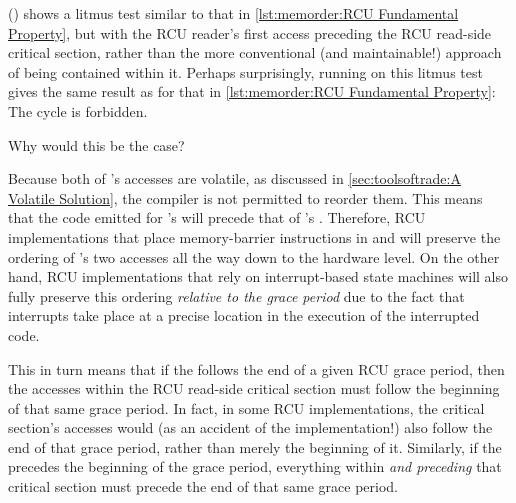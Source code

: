 \begin{listing}[tb]

\caption{What Happens Before RCU Readers?}
\label{lst:memorder:What Happens Before RCU Readers?}
\end{listing}

()
shows a litmus test similar to that in
\cref{lst:memorder:RCU Fundamental Property},
but with the RCU reader's first access preceding the RCU read-side critical
section, rather than the more conventional (and maintainable!) approach of
being contained within it.
Perhaps surprisingly, running  on this litmus test gives the
same result as for that in
\cref{lst:memorder:RCU Fundamental Property}:
The cycle is forbidden.

Why would this be the case?

Because both of 's accesses are volatile,
as discussed in
\cref{sec:toolsoftrade:A Volatile Solution},
the compiler is not permitted to reorder them.
This means that the code emitted for 's  will
precede that of 's .
Therefore, RCU implementations that place memory-barrier instructions in
 and  will preserve the ordering
of 's two accesses all the way down to the hardware level.
On the other hand, RCU implementations that rely on interrupt-based
state machines will also fully preserve this ordering
\emph{relative to the grace period} due to the fact that interrupts take
place at a precise location in the execution of the interrupted code.

This in turn means that if the  follows the end of a given
RCU grace period, then the accesses within the RCU read-side critical
section must follow the beginning of that same grace period.
In fact, in some RCU implementations, the critical section's accesses
would (as an accident of the implementation!) also follow the end of
that grace period, rather than merely the beginning of it.
Similarly, if the  precedes the beginning of the grace
period, everything within \emph{and preceding} that critical section
must precede the end of that same grace period.

\begin{listing}[tb]

\caption{What Happens After RCU Readers?}
\label{lst:memorder:What Happens After RCU Readers?}
\end{listing}

